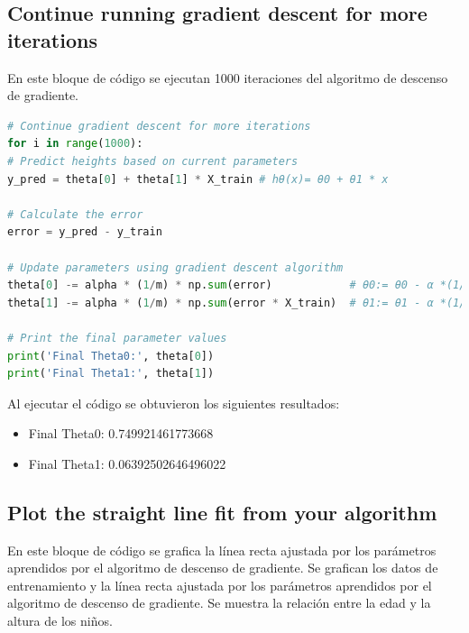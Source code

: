 \documentclass{article}
\begin{document}
\subsection{Continue running gradient descent for more iterations}\label{ssec:Continue-Running-Gradient-Descent}
En este bloque de código se ejecutan 1000 iteraciones del algoritmo de descenso de gradiente.
\begin{lstlisting}[language=Python, caption={Ejecución de 1000 iteraciones del algoritmo de descenso de gradiente},label={lst:ContinueRunningGradientDescent}]
# Continue gradient descent for more iterations
for i in range(1000):
# Predict heights based on current parameters
y_pred = theta[0] + theta[1] * X_train # hθ(x)= θ0 + θ1 * x

# Calculate the error
error = y_pred - y_train

# Update parameters using gradient descent algorithm
theta[0] -= alpha * (1/m) * np.sum(error)            # θ0:= θ0 - α *(1/m) ∑ [hθ(xi) - yi]
theta[1] -= alpha * (1/m) * np.sum(error * X_train)  # θ1:= θ1 - α *(1/m) ∑ [hθ(xi) - yi]*xi

# Print the final parameter values
print('Final Theta0:', theta[0])
print('Final Theta1:', theta[1])
\end{lstlisting}
\noindent
Al ejecutar el código se obtuvieron los siguientes resultados:
\begin{itemize}
\item Final Theta0: 0.749921461773668
\item Final Theta1: 0.06392502646496022
\end{itemize}

\subsection{Plot the straight line fit from your algorithm}\label{ssec:Plot-Straight-Line-Fit}
En este bloque de código se grafica la línea recta ajustada por los parámetros aprendidos por el algoritmo de descenso de gradiente.
Se grafican los datos de entrenamiento y la línea recta ajustada por los parámetros aprendidos por el algoritmo de descenso de gradiente.
Se muestra la relación entre la edad y la altura de los niños.
\end{document}
